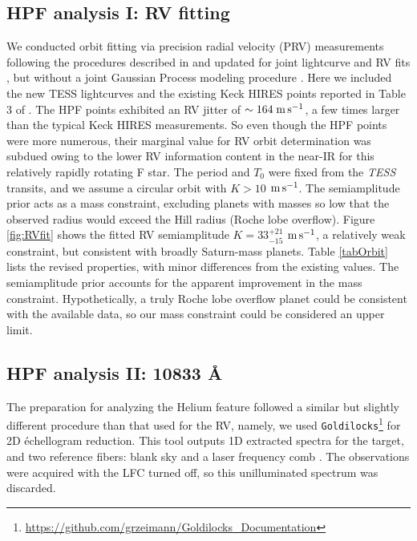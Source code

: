\documentclass[twocolumn]{aastex631}
\newcommand{\ms}{\ensuremath{\rm m\,s^{-1}}}
\begin{document}
\subsection{HPF analysis I: RV fitting}\label{secRVfit}

We conducted orbit fitting via precision radial velocity (PRV) measurements following the procedures described in \citet{2021AJ....161..173T} and updated for joint lightcurve and RV fits \citep{2022AJ....163..225T}, but without a joint Gaussian Process modeling procedure \citep{2023ApJ...950..162T}.  Here we included the new TESS lightcurves and the existing Keck HIRES points reported in Table 3 of \citet{2017AJ....153..211Z}.  The HPF points exhibited an RV jitter of $\sim164\;\ms$, a few times larger than the typical Keck HIRES measurements.  So even though the HPF points were more numerous, their marginal value for RV orbit determination was subdued owing to the lower RV information content in the near-IR for this relatively rapidly rotating F star.  The period and $T_0$ were fixed from the \emph{TESS} transits, and we assume a circular orbit with $K>10$ \ms.  The semiamplitude prior acts as a mass constraint, excluding planets with masses so low that the observed radius would exceed the Hill radius (Roche lobe overflow).  Figure \ref{fig:RVfit} shows the fitted RV semiamplitude $K=33_{-15}^{+21}$ \ms, a relatively weak constraint, but consistent with broadly Saturn-mass planets.  Table \ref{tabOrbit} lists the revised properties, with minor differences from the existing values.  The semiamplitude prior accounts for the apparent improvement in the mass constraint.  Hypothetically, a truly Roche lobe overflow planet could be consistent with the available data, so our mass constraint could be considered an upper limit.


\subsection{HPF analysis II:  10833 \AA} \label{secHeAnalysis}
The preparation for analyzing the Helium feature followed a similar but slightly different procedure than that used for the RV, namely, we used \texttt{Goldilocks}\footnote{\url{https://github.com/grzeimann/Goldilocks_Documentation}} for 2D \'echellogram reduction.  This tool outputs 1D extracted spectra for the target, and two reference fibers: blank sky and a laser frequency comb \citep[LFC,][]{2019Optic...6..233M}.  The observations were acquired with the LFC turned off, so this unilluminated spectrum was discarded.
\end{document}

